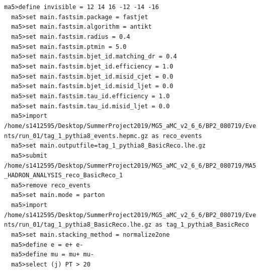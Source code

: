 \documentclass[a4paper, 10pt]{article}
\begin{document}
\texttt{ma5>define invisible = 12 14 16 -12 -14 -16\\
}
\texttt{ }\texttt{ }\texttt{ma5>set main.fastsim.package = fastjet\\
}
\texttt{ }\texttt{ }\texttt{ma5>set main.fastsim.algorithm = antikt\\
}
\texttt{ }\texttt{ }\texttt{ma5>set main.fastsim.radius = 0.4\\
}
\texttt{ }\texttt{ }\texttt{ma5>set main.fastsim.ptmin = 5.0\\
}
\texttt{ }\texttt{ }\texttt{ma5>set main.fastsim.bjet\_id.matching\_dr = 0.4\\
}
\texttt{ }\texttt{ }\texttt{ma5>set main.fastsim.bjet\_id.efficiency = 1.0\\
}
\texttt{ }\texttt{ }\texttt{ma5>set main.fastsim.bjet\_id.misid\_cjet = 0.0\\
}
\texttt{ }\texttt{ }\texttt{ma5>set main.fastsim.bjet\_id.misid\_ljet = 0.0\\
}
\texttt{ }\texttt{ }\texttt{ma5>set main.fastsim.tau\_id.efficiency = 1.0\\
}
\texttt{ }\texttt{ }\texttt{ma5>set main.fastsim.tau\_id.misid\_ljet = 0.0\\
}
\texttt{ }\texttt{ }\texttt{ma5>import /\-home/\-s1412595/\-Desktop/\-SummerProject2019/\-MG5\_aMC\_v2\_6\_6/\-BP2\_080719/\-Events/\-run\_01/\-tag\_1\_pythia8\_events.hepmc.gz as reco\_events\\
}
\texttt{ }\texttt{ }\texttt{ma5>set main.outputfile=tag\_1\_pythia8\_BasicReco.lhe.gz\\
}
\texttt{ }\texttt{ }\texttt{ma5>submit /\-home/\-s1412595/\-Desktop/\-SummerProject2019/\-MG5\_aMC\_v2\_6\_6/\-BP2\_080719/\-MA5\_HADRON\_ANALYSIS\_reco\_BasicReco\_1\\
}
\texttt{ }\texttt{ }\texttt{ma5>remove reco\_events\\
}
\texttt{ }\texttt{ }\texttt{ma5>set main.mode = parton\\
}
\texttt{ }\texttt{ }\texttt{ma5>import /\-home/\-s1412595/\-Desktop/\-SummerProject2019/\-MG5\_aMC\_v2\_6\_6/\-BP2\_080719/\-Events/\-run\_01/\-tag\_1\_pythia8\_BasicReco.lhe.gz as tag\_1\_pythia8\_BasicReco\\
}
\texttt{ }\texttt{ }\texttt{ma5>set main.stacking\_method = normalize2one\\
}
\texttt{ }\texttt{ }\texttt{ma5>define e = e+ e-\\
}
\texttt{ }\texttt{ }\texttt{ma5>define mu = mu+ mu-\\
}
\texttt{ }\texttt{ }\texttt{ma5>select (j)  PT > 20\\
}
\end{document}
